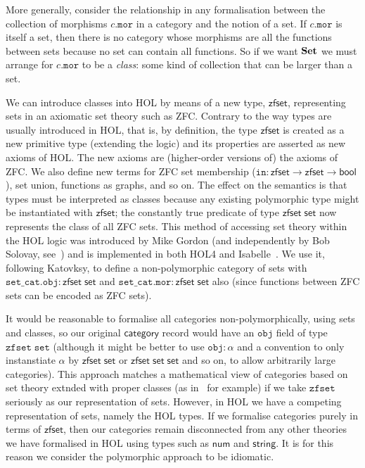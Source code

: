 \documentclass[twoside,titlepage,11pt]{article}
\begin{document}
More generally, consider the relationship in any formalisation between the collection of morphisms $c.\mathtt{mor}$ in a category and the notion of a set.
If $c.\mathtt{mor}$ is itself a set, then there is no category whose morphisms are all the functions between sets because no set can contain all functions.
So if we want $\mathbf{Set}$ we must arrange for $c.\mathtt{mor}$ to be a \emph{class}: some kind of collection that can be larger than a set.

We can introduce classes into HOL by means of a new type, $\mathsf{zfset}$, representing sets in an axiomatic set theory such as ZFC.
Contrary to the way types are usually introduced in HOL, that is, by definition, the type $\mathsf{zfset}$ is created as a new primitive type (extending the logic) and its properties are asserted as new axioms of HOL.
The new axioms are (higher-order versions of) the axioms of ZFC.
We also define new terms for ZFC set membership ($\mathtt{in}:\mathsf{zfset}\to\mathsf{zfset}\to\mathsf{bool}$), set union, functions as graphs, and so on.
The effect on the semantics is that types must be interpreted as classes because any existing polymorphic type might be instantiated with $\mathsf{zfset}$; the constantly true predicate of type $\mathsf{zfset}\;\mathsf{set}$ now represents the class of all ZFC sets.
This method of accessing set theory within the HOL logic was introduced by Mike Gordon \cite{DBLP:conf/tphol/Gordon96} (and independently by Bob Solovay, see~\cite{DBLP:conf/ictac/Obua06}) and is implemented in both HOL4 and Isabelle~\cite{DBLP:conf/ictac/Obua06}.
We use it, following Katovksy, to define a non-polymorphic category of sets with $\mathtt{set\_cat}.\mathtt{obj}:\mathsf{zfset}\;\mathsf{set}$ and $\mathtt{set\_cat}.\mathtt{mor}:\mathsf{zfset}\;\mathsf{set}$ also (since functions between ZFC sets can be encoded as ZFC sets).

It would be reasonable to formalise all categories non-polymorphically, using sets and classes, so our original $\mathsf{category}$ record would have an $\mathtt{obj}$ field of type $\mathtt{zfset}\;\mathtt{set}$ (although it might be better to use $\mathtt{obj}:\alpha$ and a convention to only instanstiate $\alpha$ by $\mathsf{zfset}\;\mathsf{set}$ or $\mathsf{zfset}\;\mathsf{set}\;\mathsf{set}$ and so on, to allow arbitrarily large categories).
This approach matches a mathematical view of categories based on set theory extnded with proper classes (as in~\cite{MacLaneCFTWM} for example) if we take $\mathtt{zfset}$ seriously as our representation of sets.
However, in HOL we have a competing representation of sets, namely the HOL types.
If we formalise categories purely in terms of $\mathsf{zfset}$, then our categories remain disconnected from any other theories we have formalised in HOL using types such as $\mathsf{num}$ and $\mathsf{string}$.
It is for this reason we consider the polymorphic approach to be idiomatic.
\end{document}
